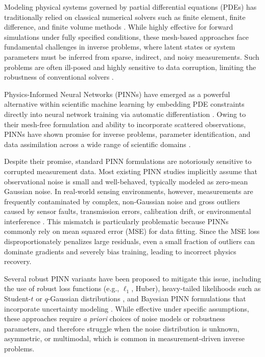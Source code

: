 \documentclass{article}
\theoremstyle{plain}
\theoremstyle{definition}
\theoremstyle{remark}
\begin{document}
Modeling physical systems governed by partial differential equations (PDEs) has traditionally relied on classical numerical solvers such as finite element, finite difference, and finite volume methods \cite{FEM-book, FDM-book}. While highly effective for forward simulations under fully specified conditions, these mesh-based approaches face fundamental challenges in inverse problems, where latent states or system parameters must be inferred from sparse, indirect, and noisy measurements. Such problems are often ill-posed and highly sensitive to data corruption, limiting the robustness of conventional solvers \cite{CptlMethods-Book, StatCom-Book}.

Physics-Informed Neural Networks (PINNs) have emerged as a powerful alternative within scientific machine learning by embedding PDE constraints directly into neural network training via automatic differentiation \cite{Raissi2019, Baydin2018}. Owing to their mesh-free formulation and ability to incorporate scattered observations, PINNs have shown promise for inverse problems, parameter identification, and data assimilation across a wide range of scientific domains \cite{Karniadakis2021}.

Despite their promise, standard PINN formulations are notoriously sensitive to corrupted measurement data. Most existing PINN studies implicitly assume that observational noise is small and well-behaved, typically modeled as zero-mean Gaussian noise. In real-world sensing environments, however, measurements are frequently contaminated by complex, non-Gaussian noise and gross outliers caused by sensor faults, transmission errors, calibration drift, or environmental interference \cite{Chander2022}. This mismatch is particularly problematic because PINNs commonly rely on mean squared error (MSE) for data fitting. Since the MSE loss disproportionately penalizes large residuals, even a small fraction of outliers can dominate gradients and severely bias training, leading to incorrect physics recovery.

Several robust PINN variants have been proposed to mitigate this issue, including the use of robust loss functions (e.g., $\ell_1$, Huber), heavy-tailed likelihoods such as Student-$t$ or $q$-Gaussian distributions \cite{Peng2022, Duarte2025}, and Bayesian PINN formulations that incorporate uncertainty modeling \cite{Yang2021}. While effective under specific assumptions, these approaches require \emph{a priori} choices of noise models or robustness parameters, and therefore struggle when the noise distribution is unknown, asymmetric, or multimodal, which is common in measurement-driven inverse problems.
\end{document}
